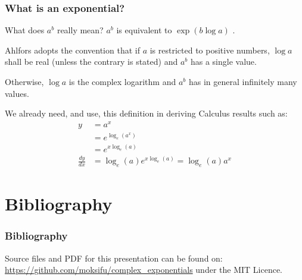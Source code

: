 \documentclass{beamer}
\begin{document}
\begin{frame}
  \frametitle{What is an exponential?}
  \begin{block}{What does $a^b$ really mean?}
    \pause
    $a^b$ is equivalent to $\exp(b \log a)$ \parencite[p.~46]{ahlfors}.

    Ahlfors \cite{ahlfors} adopts the convention that if $a$ is restricted to positive numbers, $\log a$ shall be real (unless the contrary is stated) and $a^b$ has a single value.

    Otherwise, $\log a$ is the complex logarithm and $a^b$ has in general infinitely many values.
  \end{block}
  \pause
  We already need, and use, this definition in deriving Calculus results such as:
  \begin{align*}
    y & = a^x\\
      & = e^{\log_e(a^x)}\\
      & = e^{x\log_e(a)}\\
    \frac{dy}{dx} & = \log_e(a)e^{x\log_e(a)} = \log_e(a)a^x
  \end{align*}
\end{frame}

\section{Bibliography}
\begin{frame}
  \frametitle{Bibliography}
  \printbibliography

  Source files and PDF for this presentation can be found on:
  \url{https://github.com/moksifu/complex_exponentials}
  under the MIT Licence.
\end{frame}


\end{document}

